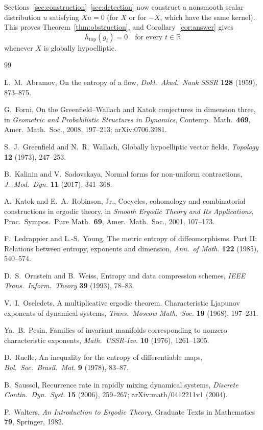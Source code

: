 \documentclass[12pt]{article}
\theoremstyle{remark}
\newcommand{\R}{\mathbb R}
\newcommand{\htop}{h_{\mathrm{top}}}
\begin{document}
Sections~\ref{sec:construction}--\ref{sec:detection} now construct a
nonsmooth scalar distribution \(u\) satisfying \(Xu=0\) (for \(X\) or
for \(-X\), which have the same kernel).
This proves Theorem~\ref{thm:obstruction}, and
Corollary~\ref{cor:answer} gives
\[
 \boxed{\htop(g_t)=0\quad\text{for every }t\in\R}
\]
whenever \(X\) is globally hypoelliptic.

\begin{thebibliography}{99}

L.~M.~Abramov,
On the entropy of a flow,
\emph{Dokl.\ Akad.\ Nauk SSSR} \textbf{128} (1959), 873--875.

G.~Forni,
On the Greenfield--Wallach and Katok conjectures in dimension three,
in \emph{Geometric and Probabilistic Structures in Dynamics},
Contemp.\ Math.\ \textbf{469}, Amer.\ Math.\ Soc., 2008, 197--213;
arXiv:0706.3981.

S.~J.~Greenfield and N.~R.~Wallach,
Globally hypoelliptic vector fields,
\emph{Topology} \textbf{12} (1973), 247--253.

B.~Kalinin and V.~Sadovskaya,
Normal forms for non-uniform contractions,
\emph{J.\ Mod.\ Dyn.} \textbf{11} (2017), 341--368.

A.~Katok and E.~A.~Robinson, Jr.,
Cocycles, cohomology and combinatorial constructions in ergodic
theory,
in \emph{Smooth Ergodic Theory and Its Applications},
Proc.\ Sympos.\ Pure Math.\ \textbf{69}, Amer.\ Math.\ Soc., 2001,
107--173.

F.~Ledrappier and L.-S.~Young,
The metric entropy of diffeomorphisms. Part II:
Relations between entropy, exponents and dimension,
\emph{Ann.\ of Math.} \textbf{122} (1985), 540--574.

D.~S.~Ornstein and B.~Weiss,
Entropy and data compression schemes,
\emph{IEEE Trans.\ Inform.\ Theory} \textbf{39} (1993), 78--83.

V.~I.~Oseledets,
A multiplicative ergodic theorem. Characteristic Ljapunov exponents
of dynamical systems,
\emph{Trans.\ Moscow Math.\ Soc.} \textbf{19} (1968), 197--231.

Ya.~B.~Pesin,
Families of invariant manifolds corresponding to nonzero
characteristic exponents,
\emph{Math.\ USSR-Izv.} \textbf{10} (1976), 1261--1305.

D.~Ruelle,
An inequality for the entropy of differentiable maps,
\emph{Bol.\ Soc.\ Brasil.\ Mat.} \textbf{9} (1978), 83--87.

B.~Saussol,
Recurrence rate in rapidly mixing dynamical systems,
\emph{Discrete Contin.\ Dyn.\ Syst.} \textbf{15} (2006), 259--267;
arXiv:math/0412211v1 (2004).

P.~Walters,
\emph{An Introduction to Ergodic Theory},
Graduate Texts in Mathematics \textbf{79}, Springer, 1982.

\end{thebibliography}
\end{document}
